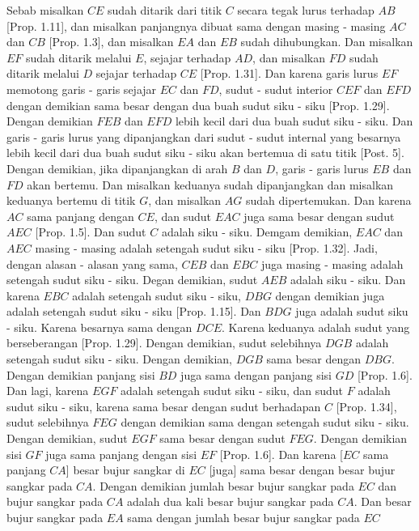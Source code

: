 \documentclass[a4paper]{book}
\begin{document}
Sebab misalkan $CE$ sudah ditarik dari titik $C$ secara tegak lurus terhadap
$AB$ [Prop. 1.11], dan misalkan panjangnya dibuat sama dengan masing - masing
$AC$ dan $CB$ [Prop. 1.3], dan misalkan $EA$ dan $EB$ sudah dihubungkan. Dan
misalkan $EF$ sudah ditarik melalui $E$, sejajar terhadap $AD$, dan misalkan
$FD$ sudah ditarik melalui $D$ sejajar terhadap $CE$ [Prop. 1.31]. Dan karena
garis lurus $EF$ memotong garis - garis sejajar $EC$ dan $FD$, sudut - sudut 
interior $CEF$ dan $EFD$ dengan demikian sama besar dengan dua buah sudut 
siku - siku [Prop. 1.29]. Dengan demikian $FEB$ dan $EFD$ lebih kecil dari
dua buah sudut siku - siku. Dan garis - garis lurus yang dipanjangkan dari
sudut - sudut internal yang besarnya lebih kecil dari dua buah sudut siku -
siku akan bertemua di satu titik [Post. 5]. Dengan demikian, jika dipanjangkan
di arah $B$ dan $D$, garis - garis lurus $EB$ dan $FD$ akan bertemu. Dan 
misalkan keduanya sudah dipanjangkan dan misalkan keduanya bertemu di titik 
$G$, dan misalkan $AG$ sudah dipertemukan. Dan karena $AC$ sama panjang dengan
$CE$, dan sudut $EAC$ juga sama besar dengan sudut $AEC$ [Prop. 1.5]. Dan 
sudut $C$ adalah siku - siku. Demgam demikian, $EAC$ dan $AEC$ masing - masing
adalah setengah sudut siku - siku [Prop. 1.32]. Jadi, dengan alasan - alasan
yang sama, $CEB$ dan $EBC$ juga masing - masing adalah setengah sudut siku - 
siku. Degan demikian, sudut $AEB$ adalah siku - siku. Dan karena $EBC$ adalah
setengah sudut siku - siku, $DBG$ dengan demikian juga adalah setengah sudut
siku - siku [Prop. 1.15]. Dan $BDG$ juga adalah sudut siku - siku. Karena 
besarnya sama dengan $DCE$. Karena keduanya adalah sudut yang berseberangan
[Prop. 1.29]. Dengan demikian, sudut selebihnya $DGB$ adalah setengah sudut
siku - siku. Dengan demikian, $DGB$ sama besar dengan $DBG$. Dengan demikian
panjang sisi $BD$ juga sama dengan panjang sisi $GD$ [Prop. 1.6]. Dan lagi,
karena $EGF$ adalah setengah sudut siku - siku, dan sudut $F$ adalah sudut
siku - siku, karena sama besar dengan sudut berhadapan $C$ [Prop. 1.34], 
sudut selebihnya $FEG$ dengan demikian sama dengan setengah sudut siku - siku.
Dengan demikian, sudut $EGF$ sama besar dengan sudut $FEG$. Dengan demikian
sisi $GF$ juga sama panjang dengan sisi $EF$ [Prop. 1.6]. Dan karena [$EC$ 
sama panjang $CA$] besar bujur sangkar di $EC$ [juga] sama besar dengan besar
bujur sangkar pada $CA$. Dengan demikian jumlah besar bujur sangkar pada $EC$ 
dan bujur sangkar pada $CA$ adalah dua kali besar bujur sangkar pada $CA$. Dan
besar bujur sangkar pada $EA$ sama dengan jumlah besar bujur sangkar pada $EC$
\end{document}
